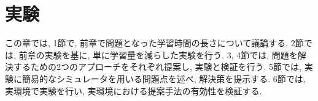 \chapter{実験}
\label{chap:experiments}
この章では, 1節で, 前章で問題となった学習時間の長さについて議論する. 2節では, 前章の実験を基に, 単に学習量を減らした実験を行う. 3, 4節では, 問題を解決するための2つのアプローチをそれぞれ提案し, 実験と検証を行う. 5節では, 実験に簡易的なシミュレータを用いる問題点を述べ, 解決策を提示する. 6節では, 実環境で実験を行い, 実環境における提案手法の有効性を検証する.  
%
%
%
% 



%

